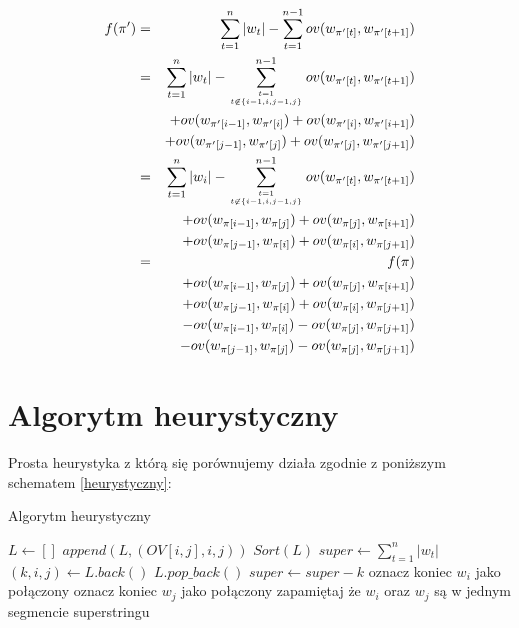 \documentclass[11pt, a4wide]{mwart}
\begin{document}
\begin{eqnarray*}
f(\pi') &=& \sum\limits_{t = 1}^n |w_t| - \sum\limits_{t = 1}^{n - 1} ov(w_{\pi'[t]}, w_{\pi'[t + 1]}) \\
        &=& \sum\limits_{t= 1}^n |w_t| -
          \sum\limits_{t = 1 \atop t \not \in \{i-1, i, j-1, j\}}^{n - 1} ov(w_{\pi'[t]}, w_{\pi'[t + 1]}) \\
          & & + ov(w_{\pi'[i-1]}, w_{\pi'[i]}) + ov(w_{\pi'[i]}, w_{\pi'[i+1]}) \\
          && + ov(w_{\pi'[j-1]}, w_{\pi'[j]}) + ov(w_{\pi'[j]}, w_{\pi'[j+1]}) \\
        &=& \sum\limits_{t = 1}^n |w_i| -
          \sum\limits_{t = 1 \atop t \not \in \{i-1, i, j-1, j\}}^{n - 1} ov(w_{\pi'[t]}, w_{\pi'[t + 1]}) \\
          && + ov(w_{\pi[i-1]}, w_{\pi[j]}) + ov(w_{\pi[j]}, w_{\pi[i+1]}) \\
          && + ov(w_{\pi[j-1]}, w_{\pi[i]}) + ov(w_{\pi[i]}, w_{\pi[j+1]}) \\
        &=& f(\pi) \\
          && + ov(w_{\pi[i-1]}, w_{\pi[j]}) + ov(w_{\pi[j]}, w_{\pi[i+1]}) \\
          && + ov(w_{\pi[j-1]}, w_{\pi[i]}) + ov(w_{\pi[i]}, w_{\pi[j+1]}) \\
          && - ov(w_{\pi[i-1]}, w_{\pi[i]}) - ov(w_{\pi[j]}, w_{\pi[j+1]}) \\
          && - ov(w_{\pi[j-1]}, w_{\pi[j]}) - ov(w_{\pi[j]}, w_{\pi[j+1]}) 
\end{eqnarray*}




\newpage
\section{Algorytm heurystyczny}
Prosta heurystyka z którą się porównujemy działa zgodnie z poniższym schematem \ref{heurystyczny}:

\begin{algorithm}[H]
\caption{Algorytm heurystyczny}
\label{heurystyczny}
\begin{algorithmic}
\State$L \gets []$
    \State $append(L, (OV[i, j], i, j))$
  \EndFor
\EndFor
\State $Sort(L)$
\State $super \gets \sum\limits_{t = 1}^n |w_t|$
  \State $(k, i, j) \gets L.back()$
  \State $L.pop\_back()$
      \State $super \gets super - k$
      \State oznacz koniec $w_i$ jako połączony
      \State oznacz koniec $w_j$ jako połączony
      \State zapamiętaj że $w_i$ oraz $w_j$ są w jednym segmencie superstringu
    \EndIf
  \EndIf
\EndWhile

\end{algorithmic}
\end{algorithm}
\end{document}

